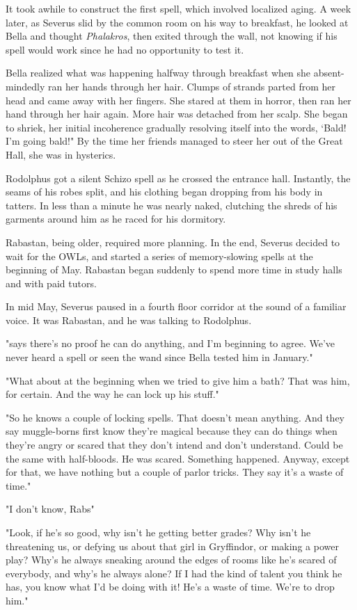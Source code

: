 It took awhile to construct the first spell, which involved localized aging. A week later, as Severus slid by the common room on his way to breakfast, he looked at Bella and thought \emph{Phalakros}, then exited through the wall, not knowing if his spell would work since he had no opportunity to test it.

Bella realized what was happening halfway through breakfast when she absent-mindedly ran her hands through her hair. Clumps of strands parted from her head and came away with her fingers. She stared at them in horror, then ran her hand through her hair again. More hair was detached from her scalp. She began to shriek, her initial incoherence gradually resolving itself into the words, `Bald! I'm going bald!" By the time her friends managed to steer her out of the Great Hall, she was in hysterics.

Rodolphus got a silent Schizo spell as he crossed the entrance hall. Instantly, the seams of his robes split, and his clothing began dropping from his body in tatters. In less than a minute he was nearly naked, clutching the shreds of his garments around him as he raced for his dormitory.

Rabastan, being older, required more planning. In the end, Severus decided to wait for the OWLs, and started a series of memory-slowing spells at the beginning of May. Rabastan began suddenly to spend more time in study halls and with paid tutors.

In mid May, Severus paused in a fourth floor corridor at the sound of a familiar voice. It was Rabastan, and he was talking to Rodolphus.

"{\el}says there's no proof he can do anything, and I'm beginning to agree. We've never heard a spell or seen the wand since Bella tested him in January."

"What about at the beginning when we tried to give him a bath? That was him, for certain. And the way he can lock up his stuff."

"So he knows a couple of locking spells. That doesn't mean anything. And they say muggle-borns first know they're magical because they can do things when they're angry or scared that they don't intend and don't understand. Could be the same with half-bloods. He was scared. Something happened. Anyway, except for that, we have nothing but a couple of parlor tricks. They say it's a waste of time."

"I don't know, Rabs{\el}"

"Look, if he's so good, why isn't he getting better grades? Why isn't he threatening us, or defying us about that girl in Gryffindor, or making a power play? Why's he always sneaking around the edges of rooms like he's scared of everybody, and why's he always alone? If I had the kind of talent you think he has, you know what I'd be doing with it! He's a waste of time. We're to drop him."

